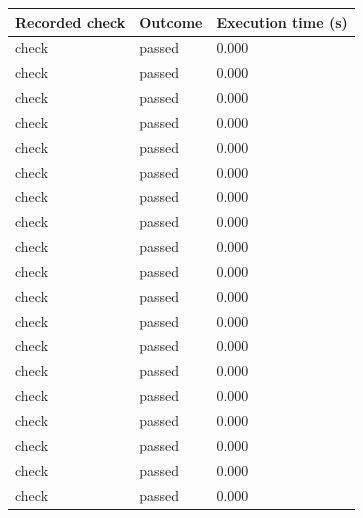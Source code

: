\documentclass[11pt,a4paper]{article}
\begin{document}
{\small\renewcommand{\arraystretch}{1.18}\begin{longtable}{@{}L{0.57\textwidth}|L{0.16\textwidth}|L{0.17\textwidth}@{}}\toprule

\textbf{Recorded check} & \textbf{Outcome} & \textbf{Execution time (\allowbreak{}s)\allowbreak{}}\\\midrule\endhead

check & passed & 0.000\\[2pt]\hline

check & passed & 0.000\\[2pt]\hline

check & passed & 0.000\\[2pt]\hline

check & passed & 0.000\\[2pt]\hline

check & passed & 0.000\\[2pt]\hline

check & passed & 0.000\\[2pt]\hline

check & passed & 0.000\\[2pt]\hline

check & passed & 0.000\\[2pt]\hline

check & passed & 0.000\\[2pt]\hline

check & passed & 0.000\\[2pt]\hline

check & passed & 0.000\\[2pt]\hline

check & passed & 0.000\\[2pt]\hline

check & passed & 0.000\\[2pt]\hline

check & passed & 0.000\\[2pt]\hline

check & passed & 0.000\\[2pt]\hline

check & passed & 0.000\\[2pt]\hline

check & passed & 0.000\\[2pt]\hline

check & passed & 0.000\\[2pt]\hline

check & passed & 0.000\\[2pt]\hline


\end{longtable}}
\end{document}
